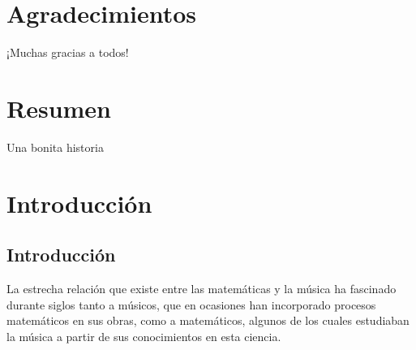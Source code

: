 \documentclass[a4paper, openright, 11pt, titlepage]{report}
\theoremstyle{definition}\newtheorem{defin}[propo]{Definition}
\theoremstyle{definition}\newtheorem{obser}[propo]{Remark}
\theoremstyle{definition}\newtheorem{ejem}[propo]{Ejemplo}
\theoremstyle{definition}\newtheorem{algoritmo}[propo]{Algoritmo}
\begin{document}
\chapter*{Agradecimientos} %
 
¡Muchas gracias a todos!

\chapter*{Resumen} %

Una bonita historia
\tableofcontents %

\cleardoublepage
{} %
\listoffigures %

\cleardoublepage
{} %
\listoftables %
\newpage
\chapter{Introducción}
\section{Introducción}

La estrecha relación que existe entre las matemáticas y la música ha fascinado durante siglos tanto a músicos, que en ocasiones han incorporado procesos matemáticos en sus obras, como a matemáticos, algunos de los cuales estudiaban la música a partir de sus conocimientos en esta ciencia.\\
\end{document}
